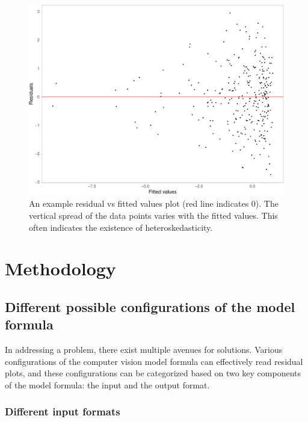 \documentclass[]{interact}
\theoremstyle{plain}%
\theoremstyle{definition}
\theoremstyle{remark}
\begin{document}
\begin{figure}

{\centering \includegraphics[width=1\linewidth]{paper_files/figure-latex/false-finding-1} 

}

\caption{An example residual vs fitted values plot (red line indicates 0). The vertical spread of the data points varies with the fitted values. This often indicates the existence of heteroskedasticity.}\label{fig:false-finding}
\end{figure}

\hypertarget{methodology}{%
\section{Methodology}\label{methodology}}

\hypertarget{different-possible-configurations-of-the-model-formula}{%
\subsection{Different possible configurations of the model
formula}\label{different-possible-configurations-of-the-model-formula}}

In addressing a problem, there exist multiple avenues for solutions.
Various configurations of the computer vision model formula can
effectively read residual plots, and these configurations can be
categorized based on two key components of the model formula: the input
and the output format.

\hypertarget{different-input-formats}{%
\subsubsection{Different input formats}\label{different-input-formats}}
\end{document}
